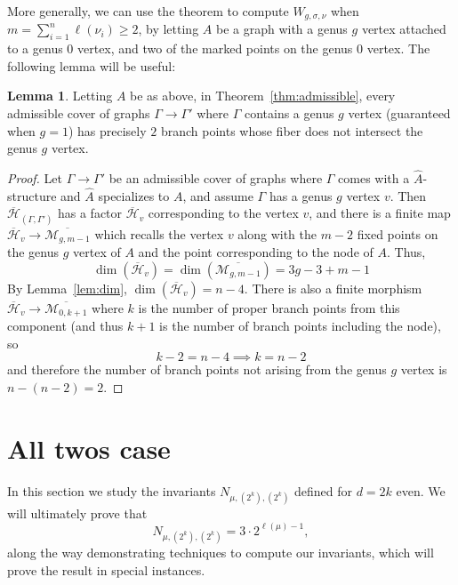 \documentclass[11pt]{article}           %
\newcommand{\Hb}{\overline{\mathcal H}}
\theoremstyle{definition}
\newtheorem{lem}[thm]{Lemma}
\begin{document}
                More generally, we can use the theorem to compute $W_{g,\sigma,\nu}$ when $m=\sum\limits_{i=1}^n\ell(\nu_i)\geq 2$, by letting $A$ be a graph with a genus $g$ vertex attached to a genus $0$ vertex, and two of the
                marked points on the genus $0$ vertex. The following lemma will be useful:

                \begin{lem}
                  \label{lem:branchpoints}
                  Letting $A$ be as above, in Theorem~\ref{thm:admissible}, every admissible cover of graphs $\Gamma\to\Gamma'$ where $\Gamma$ contains a genus $g$ vertex (guaranteed when $g=1$) has precisely $2$ branch points
                  whose fiber does not intersect the genus $g$ vertex.
                \end{lem}

                \begin{proof}
                  Let $\Gamma\to\Gamma'$ be an admissible cover of graphs where $\Gamma$ comes with a $\hat A$-structure and $\hat A$ specializes to $A$, and assume $\Gamma$ has a genus $g$ vertex $v$.
                  Then $\Hb_{(\Gamma,\Gamma')}$ has a factor $\Hb_{v}$ corresponding to the vertex $v$,
                  and there is a finite map $\Hb_{v}\to\overline{\mathcal M_{g,m-1}}$ which recalls
                  the vertex $v$ along with the $m-2$ fixed points on the genus $g$ vertex of $A$ and
                  the point corresponding to the node of $A$. Thus,
                  \[
                  \dim(\Hb_v)=\dim(\overline{\mathcal M_{g,m-1}})=3g-3+m-1
                  \]
                  By Lemma~\ref{lem:dim}, $\dim(\Hb_v)=n-4$. There is also a finite morphism
                  $\Hb_v\to\overline{\mathcal M_{0,k+1}}$ where $k$ is the number of proper branch points from this
                  component (and thus $k+1$ is the number of branch points including the node), so
                  \[
                  k-2=n-4\implies k=n-2
                  \]
                  and therefore the number of branch points not arising from the genus $g$ vertex is $n-(n-2)=2$.
                  \end{proof}


\section{All twos case}

In this section we study the invariants $N_{\mu,(2^k),(2^k)}$ defined for $d=2k$ even.
We will ultimately prove that
\[
N_{\mu,(2^k),(2^k)}=3\cdot 2^{\ell(\mu)-1},
\]
along the way demonstrating techniques to compute our invariants, which will prove the result in special instances.
\end{document}
